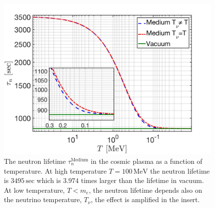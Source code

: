 \begin{figure}[t]
\begin{center}
\includegraphics[width=\linewidth]{./plots/Neutron_Lifetime_001}
\caption{The neutron lifetime $\tau_n^\mathrm{Medium}$ in the cosmic plasma as a function of temperature. At high temperature $T=100\,\mathrm{MeV}$ the neutron lifetime is $3495\,\mathrm{sec}$ which is $3.974$ times larger than the lifetime in vacuum. At low temperature, $T<m_e$, the neutron lifetime depends also on the neutrino temperature, $T_\nu$, the effect is amplified in the insert.} %
\label{Decay_Rate}
\end{center}
\end{figure}

